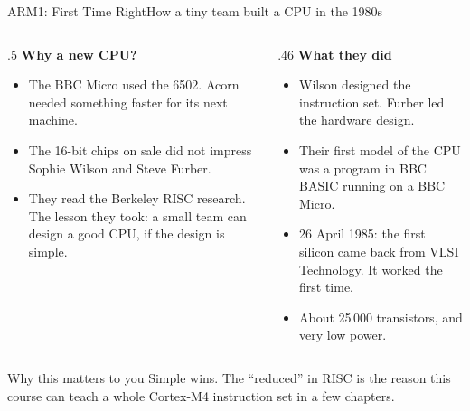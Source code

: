 \documentclass[9pt,aspectratio=169,xcolor=table]{beamer}
\begin{document}
{\beamerextras
\begin{frame}{ARM1: First Time Right}{How a tiny team built a CPU in the 1980s}
    \begin{columns}[T]
    \begin{column}{.5\textwidth}
        \textbf{Why a new CPU?}
        {\small
        \begin{itemize}\itemsep2pt
            \item The BBC Micro used the 6502. Acorn needed something faster for its next machine.
            \item The 16-bit chips on sale did not impress \alert{Sophie Wilson} and \alert{Steve Furber}.
            \item They read the Berkeley RISC research. The lesson they took: a \alert{small team} can design a good CPU, if the design is simple.
        \end{itemize}}
    \end{column}
    \begin{column}{.46\textwidth}
        \textbf{What they did}
        {\small
        \begin{itemize}\itemsep2pt
            \item Wilson designed the instruction set. Furber led the hardware design.
            \item Their first model of the CPU was a \alert{program in BBC BASIC} running on a BBC Micro.
            \item \alert{26 April 1985:} the first silicon came back from VLSI Technology. It worked the first time.
            \item About 25\,000 transistors, and very low power.
        \end{itemize}}
    \end{column}
    \end{columns}

    \vspace{3mm}
    \begin{block}{Why this matters to you}
        Simple wins. The ``reduced'' in RISC is the reason this course can teach a whole Cortex-M4 instruction set in a few chapters.
    \end{block}
\end{frame}
}
\end{document}
